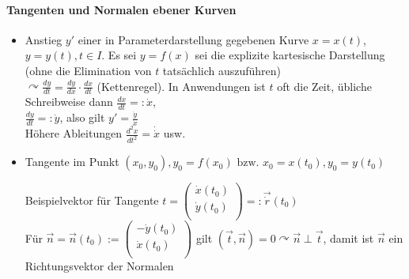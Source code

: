 \documentclass[a4paper]{scrartcl}
\begin{document}
\paragraph{Tangenten und Normalen ebener Kurven}
\begin{itemize}
\item Anstieg $y'$ einer in Parameterdarstellung gegebenen Kurve $x=x(t)$, $y=y(t), t \in I$. Es sei $y=f(x)$ sei die explizite kartesische Darstellung (ohne die Elimination von $t$ tatsächlich auszuführen)\\
$\curvearrowright \frac{dy}{dt} = \frac{dy}{dx} \cdot \frac{dx}{dt}$ (Kettenregel). In Anwendungen ist $t$ oft die Zeit, übliche Schreibweise dann $\frac{dx}{dt} =: \dot{x}$,\\
$\frac{dy}{dt} =: \dot{y}$, also gilt $y'=\frac{\dot{y}}{\dot{x}}$\\
Höhere Ableitungen $\frac{d^2x}{dt^2} = \dot{\dot{x}}$ usw.
\item Tangente im Punkt $(x_0,y_0),y_0 = f(x_0) \text{ bzw. } x_0 = x(t_0), y_0 = y(t_0)$

Beispielvektor für Tangente $t=\begin{pmatrix} \dot{x} (t_0) \\ \dot{y} (t_0) \\ \end{pmatrix} =: \vec{\dot{r}} (t_0)$\\
Für $\vec{n} = \vec{n} (t_0) := \begin{pmatrix} -\dot{y}(t_0)\\ \dot{x} (t_0)\\ \end{pmatrix}$ gilt $(\vec{t},\vec{n}) = 0 \curvearrowright \vec{n} \perp \vec{t}$, damit ist $\vec{n}$ ein Richtungsvektor der Normalen
\end{itemize}
\end{document}
